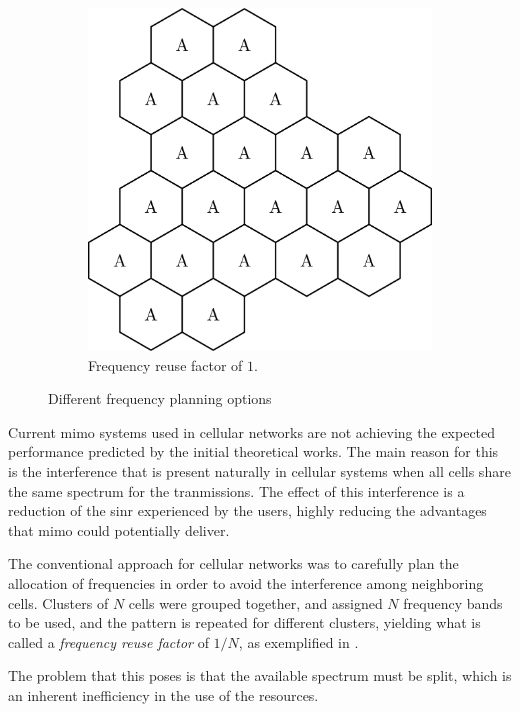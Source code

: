 \begin{figure}[t]
\begin{subfigure}[b]{0.45\textwidth}
        \includegraphics[width=\textwidth]{./01.introduction/img/universal_freq_reuse}
        \caption{Frequency reuse factor of $1$.}
        \label{fig:ufreuse}
    \end{subfigure}
    \caption{Different frequency planning options}
    \label{fig:freq_plan}
\end{figure}

Current \gls{mimo} systems used in cellular networks are not achieving the
expected performance predicted by the initial theoretical works. The main reason
for this is the interference that is present naturally in cellular systems when
all cells share the same spectrum for the tranmissions. The effect of this
interference is a reduction of the \gls{sinr} experienced by the users, highly
reducing the advantages that \gls{mimo} could potentially deliver.

The conventional approach for cellular networks was to carefully plan the
allocation of frequencies in order to avoid the interference among neighboring
cells.  Clusters of $N$ cells were grouped together, and assigned $N$ frequency
bands to be used, and the pattern is repeated for different clusters, yielding
what is called a \emph{frequency reuse factor} of $1/N$, as exemplified in
.

The problem that this poses is that the available spectrum must be split, which
is an inherent inefficiency in the use of the resources.

